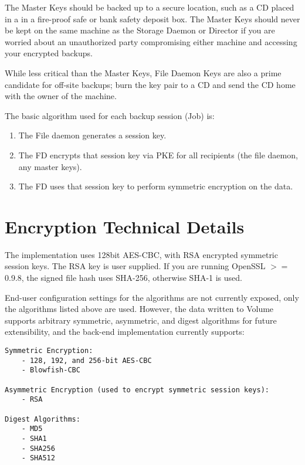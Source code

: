 The Master Keys should be backed up to a secure location, such as a CD
placed in a in a fire-proof safe or bank safety deposit box. The Master
Keys should never be kept on the same machine as the Storage Daemon or
Director if you are worried about an unauthorized party compromising either
machine and accessing your encrypted backups.

While less critical than the Master Keys, File Daemon Keys are also a prime
candidate for off-site backups; burn the key pair to a CD and send the CD
home with the owner of the machine.


The basic algorithm used for each backup session (Job) is:
\begin{enumerate}
\item The File daemon generates a session key.
\item The FD encrypts that session key via PKE for all recipients (the file
daemon, any master keys).
\item The FD uses that session key to perform symmetric encryption on the data.
\end{enumerate}



\section{Encryption Technical Details}

The implementation uses 128bit AES-CBC, with RSA encrypted symmetric
session keys. The RSA key is user supplied.
If you are running OpenSSL $>=$ 0.9.8, the signed file hash uses
SHA-256, otherwise SHA-1 is used.

End-user configuration settings for the algorithms are not currently
exposed, only the algorithms listed above are used. However, the
data written to Volume supports arbitrary symmetric, asymmetric, and
digest algorithms for future extensibility, and the back-end
implementation currently supports:

\begin{verbatim}
Symmetric Encryption:
    - 128, 192, and 256-bit AES-CBC
    - Blowfish-CBC

Asymmetric Encryption (used to encrypt symmetric session keys):
    - RSA

Digest Algorithms:
    - MD5
    - SHA1
    - SHA256
    - SHA512
\end{verbatim}


